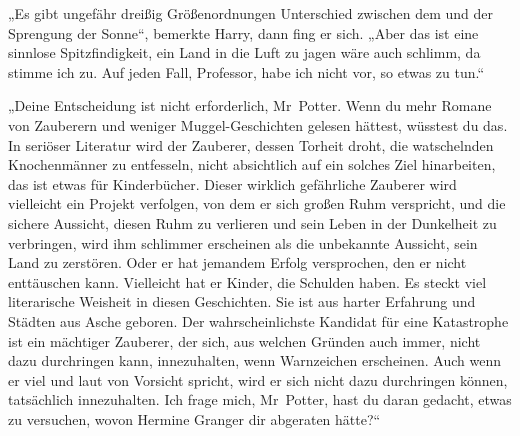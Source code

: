 „Es gibt ungefähr dreißig Größenordnungen Unterschied zwischen dem und der Sprengung der Sonne“, bemerkte Harry, dann fing er sich.
„Aber das ist eine sinnlose Spitzfindigkeit, ein Land in die Luft zu jagen wäre auch schlimm, da stimme ich zu. Auf jeden Fall, Professor, habe ich nicht vor, so etwas zu tun.“

„Deine Entscheidung ist nicht erforderlich, Mr~Potter. Wenn du mehr Romane von Zauberern und weniger Muggel-Geschichten gelesen hättest, wüsstest du das. In seriöser Literatur wird der Zauberer, dessen Torheit droht, die watschelnden Knochenmänner zu entfesseln, nicht absichtlich auf ein solches Ziel hinarbeiten, das ist etwas für Kinderbücher. Dieser wirklich gefährliche Zauberer wird vielleicht ein Projekt verfolgen, von dem er sich großen Ruhm verspricht, und die sichere Aussicht, diesen Ruhm zu verlieren und sein Leben in der Dunkelheit zu verbringen, wird ihm schlimmer erscheinen als die unbekannte Aussicht, sein Land zu zerstören. Oder er hat jemandem Erfolg versprochen, den er nicht enttäuschen kann. Vielleicht hat er Kinder, die Schulden haben. Es steckt viel literarische Weisheit in diesen Geschichten. Sie ist aus harter Erfahrung und Städten aus Asche geboren. Der wahrscheinlichste Kandidat für eine Katastrophe ist ein mächtiger Zauberer, der sich, aus welchen Gründen auch immer, nicht dazu durchringen kann, innezuhalten, wenn Warnzeichen erscheinen. Auch wenn er viel und laut von Vorsicht spricht, wird er sich nicht dazu durchringen können, tatsächlich innezuhalten. Ich frage mich, Mr~Potter, hast du daran gedacht, etwas zu versuchen, wovon Hermine Granger dir abgeraten hätte?“

